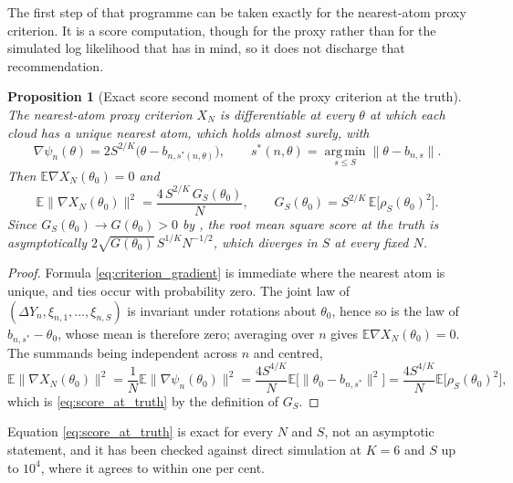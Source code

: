 \documentclass[11pt]{article}
\newtheorem{proposition}[proposition]{Proposition}
\theoremstyle{definition}
\newcommand{\E}{\mathbb{E}}
\newcommand{\thetao}{\theta_0}
\begin{document}
The first step of that programme can be taken exactly for the nearest-atom proxy criterion. It is a score computation, though for the proxy rather than for the simulated log likelihood that  has in mind, so it does not discharge that recommendation.

\begin{proposition}[Exact score second moment of the proxy criterion at the truth]\label{prop:score_at_truth}
The nearest-atom proxy criterion $X_N$ is differentiable at every $\theta$ at which each cloud has a unique nearest atom, which holds almost surely, with
\begin{equation}\label{eq:criterion_gradient}
\nabla\psi_n(\theta)=2S^{2/K}\bigl(\theta-b_{n,s^*(n,\theta)}\bigr),
\qquad
s^*(n,\theta)=\operatorname*{arg\,min}_{s\le S}\lVert\theta-b_{n,s}\rVert .
\end{equation}
Then $\E\nabla X_N(\thetao)=0$ and
\begin{equation}\label{eq:score_at_truth}
\E\bigl\lVert\nabla X_N(\thetao)\bigr\rVert^2
=\frac{4\,S^{2/K}\,G_S(\thetao)}{N},
\qquad
G_S(\thetao)=S^{2/K}\,\E\bigl[\rho_S(\thetao)^2\bigr].
\end{equation}
Since $G_S(\thetao)\to G(\thetao)>0$ by , the root mean square score at the truth is asymptotically $2\sqrt{G(\thetao)}\,S^{1/K}N^{-1/2}$, which diverges in $S$ at every fixed $N$.
\end{proposition}

\begin{proof}
Formula \eqref{eq:criterion_gradient} is immediate where the nearest atom is unique, and ties occur with probability zero. The joint law of $(\Delta Y_n,\xi_{n,1},\ldots,\xi_{n,S})$ is invariant under rotations about $\thetao$, hence so is the law of $b_{n,s^*}-\thetao$, whose mean is therefore zero; averaging over $n$ gives $\E\nabla X_N(\thetao)=0$. The summands being independent across $n$ and centred,
\[
\E\lVert\nabla X_N(\thetao)\rVert^2
=\frac1N\E\lVert\nabla\psi_n(\thetao)\rVert^2
=\frac{4S^{4/K}}{N}\E\bigl[\lVert\thetao-b_{n,s^*}\rVert^2\bigr]
=\frac{4S^{4/K}}{N}\E\bigl[\rho_S(\thetao)^2\bigr],
\]
which is \eqref{eq:score_at_truth} by the definition of $G_S$.
\end{proof}

Equation \eqref{eq:score_at_truth} is exact for every $N$ and $S$, not an asymptotic statement, and it has been checked against direct simulation at $K=6$ and $S$ up to $10^4$, where it agrees to within one per cent.
\end{document}
